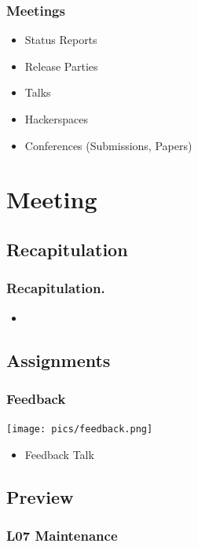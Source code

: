 \begin{frame}[<+-| alert@+>]
	\frametitle{Meetings}

	\begin{itemize}
		\item Status Reports
		\item Release Parties
		\item Talks
		\item Hackerspaces
		\item Conferences (Submissions, Papers)
	\end{itemize}
\end{frame}



\section{Meeting}

\subsection{Recapitulation}

\begin{frame}
	\frametitle{Recapitulation.}
	\begin{itemize}
		\item 
	\end{itemize}
\end{frame}

\subsection{Assignments}

\begin{frame}
	\frametitle{Feedback}

	\hfill \texttt{[image: pics/feedback.png]}
	\vspace{-1cm}
	\begin{itemize}
		\item Feedback Talk
	\end{itemize}
\end{frame}

\subsection{Preview}

\begin{frame}
	\frametitle{L07 Maintenance}
\end{frame}


\appendix

\begin{frame}[allowframebreaks]
	
	
\end{frame}






